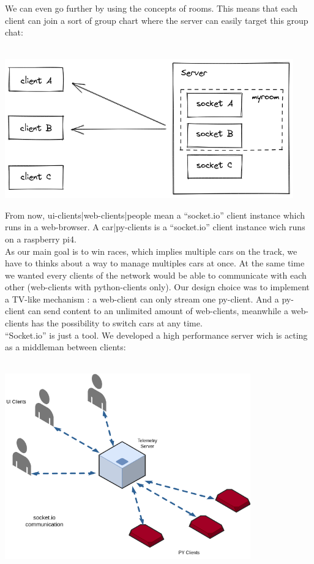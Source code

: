 \documentclass[12pt]{article}
\begin{document}
We can even go further by using the concepts of rooms. This means that each client can join a sort of group chart where the server can easily target this group chat: \\ \\
\centerline{\includegraphics[height=6cm]{../../docs/rooms.png}}

From now, ui-clients|web-clients|people mean a “socket.io” client instance which runs in a web-browser. A car|py-clients is a “socket.io” client instance wich runs on a raspberry pi4. \\

As our main goal is to win races, which implies multiple cars on the track, we have to thinks about a way to manage multiples cars at once. At the same time we wanted every clients of the network would be able to communicate with each other (web-clients with python-clients only). Our design choice was to implement a TV-like mechanism : a web-client can only stream one py-client. And a py-client can send content to an unlimited amount of web-clients, meanwhile a web-clients has the possibility to switch cars at any time. \\

“Socket.io” is just a tool. We developed a high performance server wich is acting as a middleman between clients: \\ \\
\centerline{\includegraphics[height=8cm]{../../docs/diagram.png}}
\end{document}
